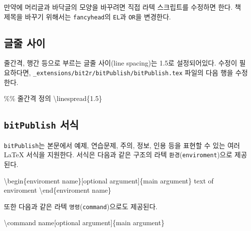 \documentclass[
  letterpaper,
]{book}
\newenvironment{Shaded}{\begin{snugshade}}{\end{snugshade}}
\newcommand{\CommentTok}[1]{\textcolor[rgb]{0.37,0.37,0.37}{#1}}
\newcommand{\ErrorTok}[1]{\textcolor[rgb]{0.68,0.00,0.00}{#1}}
\newcommand{\ExtensionTok}[1]{\textcolor[rgb]{0.00,0.23,0.31}{#1}}
\newcommand{\FunctionTok}[1]{\textcolor[rgb]{0.28,0.35,0.67}{#1}}
\newcommand{\KeywordTok}[1]{\textcolor[rgb]{0.00,0.23,0.31}{#1}}
\newcommand{\NormalTok}[1]{\textcolor[rgb]{0.00,0.23,0.31}{#1}}
\begin{document}
만약에 머리글과 바닥글의 모양을 바꾸려면 직접 라텍 스크립트를 수정하면
한다. 책 제목을 바꾸기 위해서는 \texttt{fancyhead}의
\texttt{EL}과 \texttt{OR}을 변경한다.

\hypertarget{uxae00uxc904-uxc0acuxc774}{%
\subsection{글줄 사이}\label{uxae00uxc904-uxc0acuxc774}}

줄간격, 행간 등으로 부르는 글줄 사이(line
spacing)는 1.5로 설정되어있다. 수정이 필요하다면,
\texttt{\_extensions/bit2r/bitPublish/bitPublish.tex} 파일의 다음 행을
수정한다.

\begin{Shaded}
\begin{Highlighting}[]
\CommentTok{\%\% 줄간격 정의}
\FunctionTok{\textbackslash{}linespread}\NormalTok{\{1.5\}}
\end{Highlighting}
\end{Shaded}

\hypertarget{bitpublish-uxc11cuxc2dd}{%
\subsection{\texorpdfstring{\texttt{bitPublish}
서식}{bitPublish 서식}}\label{bitpublish-uxc11cuxc2dd}}

\texttt{bitPublish}는 본문에서 예제, 연습문제, 주의, 정보, 인용 등을
표현할 수 있는 여러 LaTeX 서식을 지원한다. 서식은 다음과 같은 구조의
라텍
\texttt{환경}(\texttt{enviroment})으로
제공된다.

\begin{Shaded}
\begin{Highlighting}[]
\KeywordTok{\textbackslash{}begin}\NormalTok{\{}\ExtensionTok{enviroment}\ErrorTok{ name}\NormalTok{\}[optional argument]\{main argument\}}
\NormalTok{  text of enviroment}
\KeywordTok{\textbackslash{}end}\NormalTok{\{}\ExtensionTok{enviroment}\ErrorTok{ name}\NormalTok{\}}
\end{Highlighting}
\end{Shaded}

또한 다음과 같은 라텍 \texttt{명령}(\texttt{command})으로도 제공된다.

\begin{Shaded}
\begin{Highlighting}[]
\FunctionTok{\textbackslash{}command}\NormalTok{ name[optional argument]\{main argument\} }
\end{Highlighting}
\end{Shaded}
\end{document}
